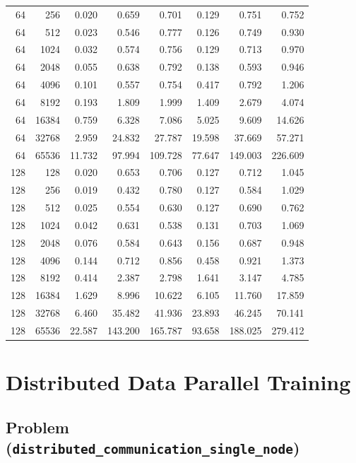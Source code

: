 \documentclass[11pt]{article}
\begin{document}
\begin{table}[H]
\begin{tabular}{rrrrrrrr}
64 & 256 & 0.020 & 0.659 & 0.701 & 0.129 & 0.751 & 0.752 \\
64 & 512 & 0.023 & 0.546 & 0.777 & 0.126 & 0.749 & 0.930 \\
64 & 1024 & 0.032 & 0.574 & 0.756 & 0.129 & 0.713 & 0.970 \\
64 & 2048 & 0.055 & 0.638 & 0.792 & 0.138 & 0.593 & 0.946 \\
64 & 4096 & 0.101 & 0.557 & 0.754 & 0.417 & 0.792 & 1.206 \\
64 & 8192 & 0.193 & 1.809 & 1.999 & 1.409 & 2.679 & 4.074 \\
64 & 16384 & 0.759 & 6.328 & 7.086 & 5.025 & 9.609 & 14.626 \\
64 & 32768 & 2.959 & 24.832 & 27.787 & 19.598 & 37.669 & 57.271 \\
64 & 65536 & 11.732 & 97.994 & 109.728 & 77.647 & 149.003 & 226.609 \\
128 & 128 & 0.020 & 0.653 & 0.706 & 0.127 & 0.712 & 1.045 \\
128 & 256 & 0.019 & 0.432 & 0.780 & 0.127 & 0.584 & 1.029 \\
128 & 512 & 0.025 & 0.554 & 0.630 & 0.127 & 0.690 & 0.762 \\
128 & 1024 & 0.042 & 0.631 & 0.538 & 0.131 & 0.703 & 1.069 \\
128 & 2048 & 0.076 & 0.584 & 0.643 & 0.156 & 0.687 & 0.948 \\
128 & 4096 & 0.144 & 0.712 & 0.856 & 0.458 & 0.921 & 1.373 \\
128 & 8192 & 0.414 & 2.387 & 2.798 & 1.641 & 3.147 & 4.785 \\
128 & 16384 & 1.629 & 8.996 & 10.622 & 6.105 & 11.760 & 17.859 \\
128 & 32768 & 6.460 & 35.482 & 41.936 & 23.893 & 46.245 & 70.141 \\
128 & 65536 & 22.587 & 143.200 & 165.787 & 93.658 & 188.025 & 279.412 \\
\bottomrule
\end{tabular}
\end{table}

\newpage


\section{Distributed Data Parallel Training}


\subsection{Problem (\texttt{distributed\_communication\_single\_node})}
\end{document}
